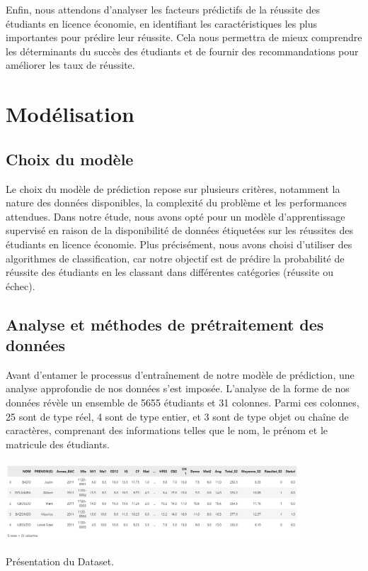 Enfin, nous attendons d'analyser les facteurs prédictifs de la réussite des étudiants en licence économie, en identifiant les caractéristiques les plus importantes pour prédire leur réussite. Cela nous permettra de mieux comprendre les déterminants du succès des étudiants et de fournir des recommandations pour améliorer les taux de réussite.

\section{Modélisation}

\subsection{Choix du modèle}
Le choix du modèle de prédiction repose sur plusieurs critères, notamment la nature des données disponibles, la complexité du problème et les performances attendues. Dans notre étude, nous avons opté pour un modèle d'apprentissage supervisé en raison de la disponibilité de données étiquetées sur les réussites des étudiants en licence économie. Plus précisément, nous avons choisi d'utiliser des algorithmes de classification, car notre objectif est de prédire la probabilité de réussite des étudiants en les classant dans différentes catégories (réussite ou échec).

\subsection{Analyse et méthodes de prétraitement des données}
Avant d'entamer le processus d'entraînement de notre modèle de prédiction, une analyse approfondie de nos données s'est imposée.
L'analyse de la forme de nos données révèle un ensemble de 5655 étudiants et 31 colonnes. Parmi ces colonnes, 25 sont de type réel, 4 sont de type entier, et 3 sont de type objet ou chaîne de caractères, comprenant des informations telles que le nom, le prénom et le matricule des étudiants. 

\begin{table}[H]%
    \center%
    \setlength{\fboxsep}{5pt}%
    \setlength{\fboxrule}{0.5pt}%
    \includegraphics[width=11cm,height=3cm]{images/Dataset.png}%
    \caption{Présentation du Dataset.}%
\end{table}

